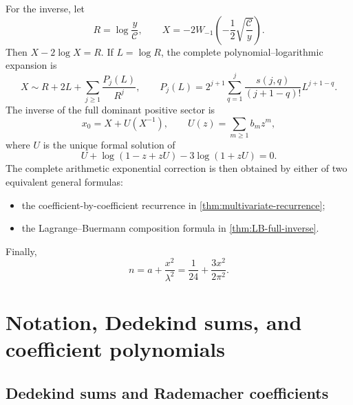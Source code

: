 \documentclass[11pt,a4paper]{article}
\numberwithin{equation}{section}
\theoremstyle{remark}
\newcommand{\Ccal}{\mathcal C}
\begin{document}
For the inverse, let
\begin{equation}\label{eq:intro-X}
 R=\log\frac{y}{\Ccal},\qquad
 X=-2W_{-1}\!\left(-\frac12\sqrt{\frac{\Ccal}{y}}\right).
\end{equation}
Then $X-2\log X=R$.  If $L=\log R$, the complete polynomial--logarithmic expansion is
\begin{equation}\label{eq:intro-Xexp}
 X\sim R+2L+\sum_{j\ge1}\frac{P_j(L)}{R^j},\qquad
 P_j(L)=2^{j+1}\sum_{q=1}^{j}
 \frac{s(j,q)}{(j+1-q)!}L^{j+1-q}.
\end{equation}
The inverse of the full dominant positive sector is
\begin{equation}\label{eq:intro-x0}
 x_0=X+U(X^{-1}),\qquad U(z)=\sum_{m\ge1}b_mz^m,
\end{equation}
where $U$ is the unique formal solution of
\begin{equation}\label{eq:intro-Ueq}
 U+\log(1-z+zU)-3\log(1+zU)=0.
\end{equation}
The complete arithmetic exponential correction is then obtained by either of two equivalent general formulas:
\begin{itemize}
\item the coefficient-by-coefficient recurrence in \cref{thm:multivariate-recurrence};
\item the Lagrange--Buer\-mann composition formula in \cref{thm:LB-full-inverse}.
\end{itemize}
Finally,
\begin{equation}\label{eq:intro-n-from-x}
 n=a+\frac{x^2}{\lambda^2}=\frac1{24}+\frac{3x^2}{2\pi^2}.
\end{equation}

\section{Notation, Dedekind sums, and coefficient polynomials}\label{sec:notation}

\subsection{Dedekind sums and Rademacher coefficients}
\end{document}
